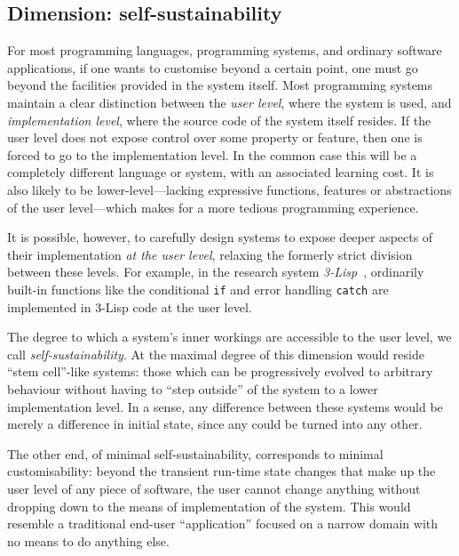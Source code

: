 \documentclass[ twoside,openright,titlepage,numbers=noenddot,headinclude,footinclude,cleardoublepage=empty,abstract=on,
                BCOR=5mm,paper=a4,fontsize=11pt
                ]{scrreprt}
\theoremstyle{definition}
\begin{document}
\hypertarget{dimension-self-sustainability}{\subsection{Dimension:
self-sustainability}\label{dimension-self-sustainability}}

For most programming languages, programming systems, and ordinary
software applications, if one wants to customise beyond a certain point,
one must go beyond the facilities provided in the system itself. Most
programming systems maintain a clear distinction between the \emph{user
level}, where the system is used, and \emph{implementation level}, where
the source code of the system itself resides. If the user level does not
expose control over some property or feature, then one is forced to go
to the implementation level. In the common case this will be a
completely different language or system, with an associated learning
cost. It is also likely to be lower-level---lacking expressive
functions, features or abstractions of the user level---which makes for
a more tedious programming experience.

It is possible, however, to carefully design systems to expose deeper
aspects of their implementation \emph{at the user level}, relaxing the
formerly strict division between these levels. For example, in the
research system \emph{3-Lisp}~\parencite{ProcRefl}, ordinarily built-in
functions like the conditional \texttt{if} and error handling
\texttt{catch} are implemented in 3-Lisp code at the user level.

The degree to which a system's inner workings are accessible to the user
level, we call \emph{self-sustainability}. At the maximal degree of this
dimension would reside ``stem cell''-like systems: those which can be
progressively evolved to arbitrary behaviour without having to ``step
outside'' of the system to a lower implementation level. In a sense, any
difference between these systems would be merely a difference in initial
state, since any could be turned into any other.

The other end, of minimal self-sustainability, corresponds to minimal
customisability: beyond the transient run-time state changes that make
up the user level of any piece of software, the user cannot change
anything without dropping down to the means of implementation of the
system. This would resemble a traditional end-user ``application''
focused on a narrow domain with no means to do anything else.
\end{document}
